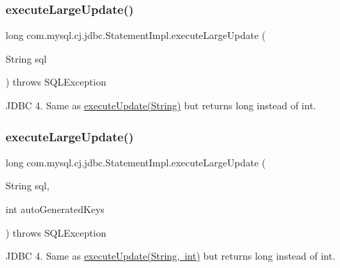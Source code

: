 \subsubsection{\texorpdfstring{execute\+Large\+Update()}{executeLargeUpdate()}\hspace{0.1cm}{\footnotesize\ttfamily [1/4]}}
{\footnotesize\ttfamily long com.\+mysql.\+cj.\+jdbc.\+Statement\+Impl.\+execute\+Large\+Update (\begin{DoxyParamCaption}\item[{String}]{sql }\end{DoxyParamCaption}) throws S\+Q\+L\+Exception}

J\+D\+BC 4. Same as \mbox{\hyperlink{classcom_1_1mysql_1_1cj_1_1jdbc_1_1_statement_impl_a8df7dbcd016833437419cfdbae14b187}{execute\+Update(\+String)}} but returns long instead of int. \mbox{\label{classcom_1_1mysql_1_1cj_1_1jdbc_1_1_statement_impl_acb364f005fd4a5b579ebecbc3303fca9}} 
\subsubsection{\texorpdfstring{execute\+Large\+Update()}{executeLargeUpdate()}\hspace{0.1cm}{\footnotesize\ttfamily [2/4]}}
{\footnotesize\ttfamily long com.\+mysql.\+cj.\+jdbc.\+Statement\+Impl.\+execute\+Large\+Update (\begin{DoxyParamCaption}\item[{String}]{sql,  }\item[{int}]{auto\+Generated\+Keys }\end{DoxyParamCaption}) throws S\+Q\+L\+Exception}

J\+D\+BC 4. Same as \mbox{\hyperlink{classcom_1_1mysql_1_1cj_1_1jdbc_1_1_statement_impl_a17446c85d153a1456965eb64858b5f46}{execute\+Update(\+String, int)}} but returns long instead of int. \mbox{\label{classcom_1_1mysql_1_1cj_1_1jdbc_1_1_statement_impl_a80eeb600ed30f4f2dc7ea99891e594b1}} 
